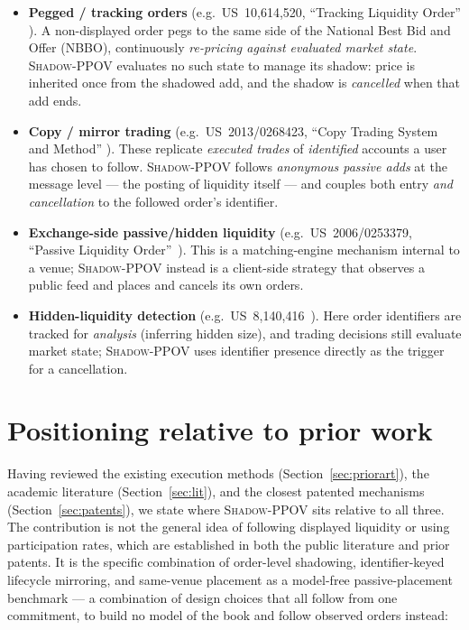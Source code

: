 \documentclass[11pt]{article}
\newcommand{\pov}{\textsc{Shadow-PPOV}}
\begin{document}
\begin{itemize}[leftmargin=1.4em]
  \item \textbf{Pegged / tracking orders} (e.g.\ US~10,614,520,
  ``Tracking Liquidity Order'' \cite{us10614520}). A non-displayed order pegs
  to the same side of the National Best Bid and Offer (NBBO), continuously
  \emph{re-pricing against evaluated market state}. \pov{} evaluates no such state to manage its shadow: price is
  inherited once from the shadowed add, and the shadow is \emph{cancelled} when
  that add ends.
  \item \textbf{Copy / mirror trading} (e.g.\ US~2013/0268423, ``Copy Trading
  System and Method'' \cite{us20130268423}). These replicate \emph{executed
  trades} of \emph{identified} accounts a user has chosen to follow. \pov{}
  follows \emph{anonymous passive adds} at the message level --- the posting of
  liquidity itself --- and couples both entry \emph{and cancellation} to the
  followed order's identifier.
  \item \textbf{Exchange-side passive/hidden liquidity} (e.g.\
  US~2006/0253379, ``Passive Liquidity Order''~\cite{us20060253379}). This is a matching-engine
  mechanism internal to a venue; \pov{} instead is a client-side strategy that
  observes a public feed and places and cancels its own orders.
  \item \textbf{Hidden-liquidity detection} (e.g.\ US~8,140,416~\cite{us8140416}). Here order
  identifiers are tracked for \emph{analysis} (inferring hidden size), and
  trading decisions still evaluate market state; \pov{} uses identifier
  presence directly as the trigger for a cancellation.
\end{itemize}

\section{Positioning relative to prior work}
\label{sec:novelty}

Having reviewed the existing execution methods (Section~\ref{sec:priorart}),
the academic literature (Section~\ref{sec:lit}), and the closest patented
mechanisms (Section~\ref{sec:patents}), we state where \pov{} sits relative to
all three. The contribution is not the general idea of following displayed
liquidity or using participation rates, which are established in both the public
literature and prior patents. It is the specific combination of order-level
shadowing, identifier-keyed lifecycle mirroring, and same-venue placement as a
model-free passive-placement benchmark --- a combination of design choices that
all follow from one commitment, to build no model of the book and follow
observed orders instead:
\end{document}
